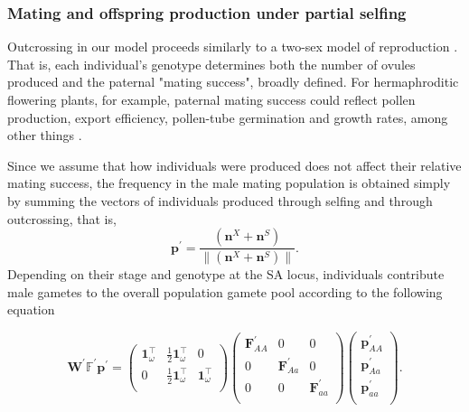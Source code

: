 \documentclass[11pt]{article}
\def\mbf#1{\mathbf{#1}}
\def\mbb#1{\mathbb{#1}}
\begin{document}
\subsubsection*{Mating and offspring production under partial selfing}
 Outcrossing in our model proceeds similarly to a two-sex model of reproduction \citep{deVriesCaswell2019b}. That is, each individual's genotype determines both the number of ovules produced and the paternal "mating success", broadly defined. For hermaphroditic flowering plants, for example, paternal mating success could reflect pollen production, export efficiency, pollen-tube germination and growth rates, among other things \citep{LloydWebb1986, WangBarrett2020, Harder2016}. 

Since we assume that how individuals were produced does not affect their relative mating success, the frequency in the male mating population is obtained simply by summing the vectors of individuals produced through selfing and through outcrossing, that is, 
\begin{equation}
 	\mbf{p}^{\prime}=\frac{(\mbf{n}^X + \mbf{n}^S)}{\| (\mbf{n}^X + \mbf{n}^S)\|}.
 \end{equation} 
Depending on their stage and genotype at the SA locus, individuals contribute male gametes to the overall population gamete pool according to the following equation
\begin{linenomath*}
\begin{equation}
		\mbf{W}^{\prime} \mbb{F}^{\prime} \mbf{p}^{\prime}= 
		\left(
			\begin{array}{ccc}
				\mbf{1}^{\intercal}_{\omega} & \frac{1}{2} \mbf{1}^{\intercal}_{\omega} & 0 \\
				0 & \frac{1}{2} \mbf{1}^{\intercal}_{\omega} & \mbf{1}^{\intercal}_{\omega} \\
			\end{array} \right)
		\left(
			\begin{array}{ccc}
				\mbf{F}^{\prime}_{AA} & 0 & 0 \\
				0 & \mbf{F}^{\prime}_{Aa} & 0 \\
				0 & 0 & \mbf{F}^{\prime}_{aa} \\
			\end{array} \right)
		\left(
			\begin{array}{c}
				\mbf{p}^{\prime}_{AA} \\
				\mbf{p}^{\prime}_{Aa} \\
				\mbf{p}^{\prime}_{aa} \\
			\end{array} \right).
\end{equation}
\end{linenomath*}
\end{document}
